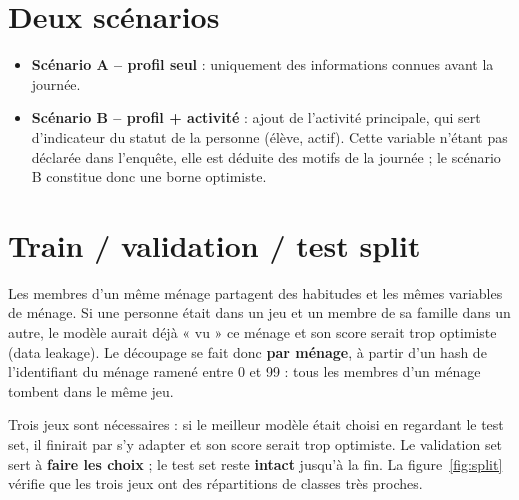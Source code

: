 \documentclass[12pt,a4paper]{report}
\newcommand{\1}{\mathbf{1}}
\begin{document}
\section{Deux scénarios}
\begin{itemize}[leftmargin=*]
  \item \textbf{Scénario A -- profil seul} : uniquement des informations connues avant la journée.
  \item \textbf{Scénario B -- profil + activité} : ajout de l'activité principale, qui sert d'indicateur du statut de la personne (élève, actif). Cette variable n'étant pas déclarée dans l'enquête, elle est déduite des motifs de la journée ; le scénario B constitue donc une borne optimiste.
\end{itemize}

\section{Train / validation / test split}
Les membres d'un même ménage partagent des habitudes et les mêmes variables de ménage. Si une personne était dans un jeu et un membre de sa famille dans un autre, le modèle aurait déjà « vu » ce ménage et son score serait trop optimiste (data leakage). Le découpage se fait donc \textbf{par ménage}, à partir d'un hash de l'identifiant du ménage ramené entre 0 et 99 : tous les membres d'un ménage tombent dans le même jeu.

\begin{table}[H]
\centering
\caption{Rôle et taille des trois jeux}\label{tab:split}
\small
{}
\end{table}

Trois jeux sont nécessaires : si le meilleur modèle était choisi en regardant le test set, il finirait par s'y adapter et son score serait trop optimiste. Le validation set sert à \textbf{faire les choix} ; le test set reste \textbf{intact} jusqu'à la fin. La figure~\ref{fig:split} vérifie que les trois jeux ont des répartitions de classes très proches.
\end{document}

